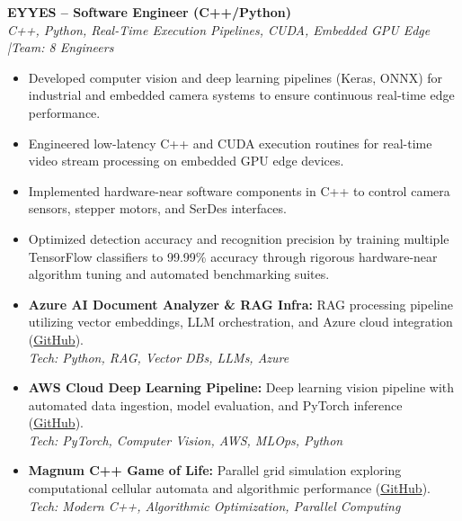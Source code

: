 \documentclass[10pt,a4paper]{article}
\begin{document}
\vspace{0.15cm}
\textbf{EYYES -- Software Engineer (C++/Python)} \\
\textit{C++, Python, Real-Time Execution Pipelines, CUDA, Embedded GPU Edge \quad|\quad Team: 8 Engineers}
\begin{itemize}
    \item Developed computer vision and deep learning pipelines (Keras, ONNX) for industrial and embedded camera systems to ensure continuous real-time edge performance.
    \item Engineered low-latency C++ and CUDA execution routines for real-time video stream processing on embedded GPU edge devices.
    \item Implemented hardware-near software components in C++ to control camera sensors, stepper motors, and SerDes interfaces.
    \item Optimized detection accuracy and recognition precision by training multiple TensorFlow classifiers to 99.99\% accuracy through rigorous hardware-near algorithm tuning and automated benchmarking suites.
\end{itemize}



\begin{itemize}[leftmargin=1.5em, itemsep=0.2em]
    \item \textbf{Azure AI Document Analyzer \& RAG Infra:} RAG processing pipeline utilizing vector embeddings, LLM orchestration, and Azure cloud integration (\href{https://github.com/CodeByMaxx/AI-Document-Analyzer}{GitHub}).\\
    \textit{Tech: Python, RAG, Vector DBs, LLMs, Azure}
    \item \textbf{AWS Cloud Deep Learning Pipeline:} Deep learning vision pipeline with automated data ingestion, model evaluation, and PyTorch inference (\href{https://github.com/CodeByMaxx/aws-pneumonia-detection}{GitHub}).\\
    \textit{Tech: PyTorch, Computer Vision, AWS, MLOps, Python}
    \item \textbf{Magnum C++ Game of Life:} Parallel grid simulation exploring computational cellular automata and algorithmic performance (\href{https://github.com/CodeByMaxx/magnum-game-of-life}{GitHub}).\\
    \textit{Tech: Modern C++, Algorithmic Optimization, Parallel Computing}
\end{itemize}
\end{document}
